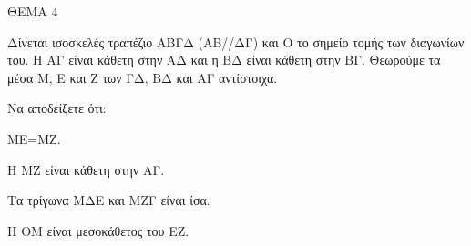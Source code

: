 
ΘΕΜΑ 4

Δίνεται ισοσκελές τραπέζιο ΑΒΓΔ (ΑΒ//ΔΓ) και Ο το σημείο τομής των διαγωνίων του. Η ΑΓ είναι κάθετη στην ΑΔ και η ΒΔ είναι κάθετη στην ΒΓ. Θεωρούμε τα μέσα Μ, Ε και Ζ των ΓΔ, ΒΔ και ΑΓ αντίστοιχα.

Να αποδείξετε ότι:

\begin{alist}
\item ΜΕ=ΜΖ. 

\item Η ΜΖ είναι κάθετη στην ΑΓ. 

\item Τα τρίγωνα ΜΔΕ και ΜΖΓ είναι ίσα. 

\item Η ΟΜ είναι μεσοκάθετος του ΕΖ. 


\end{alist}
